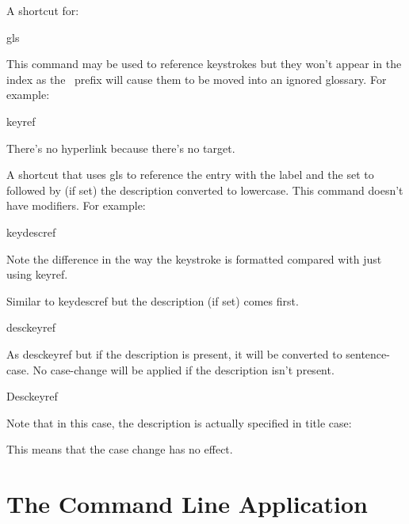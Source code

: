 \documentclass[toc=listof]{scrreport}
\newcommand{\glsopt}[2][]{\opt[#1]{gls.#2}}
\begin{document}
A shortcut for:
\begin{compactcodebox}
\gls{gls}
\end{compactcodebox}
This command may be used to reference keystrokes but they won't
appear in the index as the \ prefix will cause them to
be moved into an ignored glossary.
For example:
\begin{coderesult}
\gls{keyref}
\tcblower
{}
\end{coderesult}
There's no hyperlink because there's no target.

A shortcut that uses \gls{gls} to reference the entry with the
label  and the \glsopt{format}
set to  followed by
(if set) the description converted to lowercase. This command doesn't have modifiers.
For example:
\begin{coderesult}
\gls{keydescref}
\tcblower
{}
\end{coderesult}
Note the difference in the way the keystroke is formatted compared
with just using \gls{keyref}.

Similar to \gls{keydescref} but the description (if set) comes
first.
\begin{coderesult}
\gls{desckeyref}
\tcblower
{}
\end{coderesult}

As \gls{desckeyref} but if the description is present, it will be
converted to sentence-case. No case-change will be applied if the
description isn't present.
\begin{coderesult}
\gls{Desckeyref}
\tcblower
{}
\end{coderesult}
Note that in this case, the description is actually specified in
title case:
\begin{compactcodebox}
\end{compactcodebox}
This means that the case change has no effect.



\chapter{The  Command Line Application}
\label{sec:texjavahelpmk}
\end{document}
